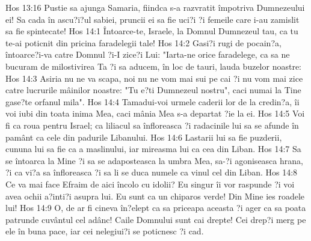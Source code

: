 Hos 13:16  Pustie sa ajunga Samaria, fiindca s-a razvratit împotriva Dumnezeului ei! Sa cada în ascu?i?ul sabiei, pruncii ei sa fie uci?i ?i femeile care i-au zamislit sa fie spintecate!
Hos 14:1  Întoarce-te, Israele, la Domnul Dumnezeul tau, ca tu te-ai poticnit din pricina faradelegii tale!
Hos 14:2  Gasi?i rugi de pocain?a, întoarce?i-va catre Domnul ?i-I zice?i Lui: "Iarta-ne orice faradelege, ca sa ne bucuram de milostivirea Ta ?i sa aducem, în loc de tauri, lauda buzelor noastre:
Hos 14:3  Asiria nu ne va scapa, noi nu ne vom mai sui pe cai ?i nu vom mai zice catre lucrurile mâinilor noastre: "Tu e?ti Dumnezeul nostru", caci numai la Tine gase?te orfanul mila".
Hos 14:4  Tamadui-voi urmele caderii lor de la credin?a, îi voi iubi din toata inima Mea, caci mânia Mea s-a departat ?ie la ei.
Hos 14:5  Voi fi ca roua pentru Israel; ca liliacul sa înfloreasca ?i radacinile lui sa se afunde în pamânt ca cele din padurile Libanului.
Hos 14:6  Lastarii lui sa fie puzderii, cununa lui sa fie ca a maslinului, iar mireasma lui ca cea din Liban.
Hos 14:7  Sa se întoarca la Mine ?i sa se adaposteasca la umbra Mea, sa-?i agoniseasca hrana, ?i ca vi?a sa înfloreasca ?i sa li se duca numele ca vinul cel din Liban.
Hos 14:8  Ce va mai face Efraim de aici încolo cu idolii? Eu singur îi vor raspunde ?i voi avea ochii a?inti?i asupra lui. Eu sunt ca un chiparos verde! Din Mine ies roadele lui!
Hos 14:9  O, de ar fi cineva în?elept ca sa priceapa aceasta ?i ager ca sa poata patrunde cuvântul cel adânc! Caile Domnului sunt cai drepte! Cei drep?i merg pe ele în buna pace, iar cei nelegiui?i se poticnesc ?i cad.



